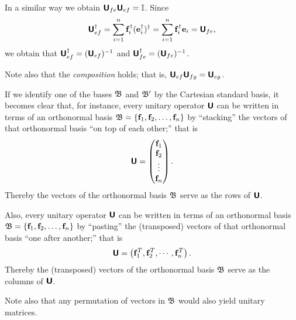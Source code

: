 In a similar way we obtain
$\textsf{\textbf{U}}_{fe}\textsf{\textbf{U}}_{ef}=
{\Bbb I}$.
Since
\begin{equation}
\textsf{\textbf{U}}_{ef}^\dagger = \sum_{i=1}^n  {\bf f}_i^\dagger ( {\bf e}_i^\dagger)^\dagger
= \sum_{i=1}^n  {\bf f}_i^\dagger {\bf e}_i
= \textsf{\textbf{U}}_{fe},
\end{equation}
we obtain that $\textsf{\textbf{U}}_{ef}^\dagger = (\textsf{\textbf{U}}_{ef})^{-1}$
and $\textsf{\textbf{U}}_{fe}^\dagger = (\textsf{\textbf{U}}_{fe})^{-1}$.

Note also that the {\em composition} holds; that is, $\textsf{\textbf{U}}_{ef} \textsf{\textbf{U}}_{fg}=  \textsf{\textbf{U}}_{eg}$.



If we
identify one of the bases  ${\frak B}$ and ${\frak B}'$ by the Cartesian standard basis,
it becomes clear that, for instance,
every unitary operator  $\textsf{\textbf{U}}$  can be written in terms of an orthonormal basis
${\frak B}=\{{\bf f}_1,  {\bf f}_2, \ldots , {\bf f}_n\}$
by ``stacking'' the vectors of that orthonormal basis ``on top of each other;''
that is
\begin{equation}
\textsf{\textbf{U}}=
\begin{pmatrix}
{\bf f}_1\\
{\bf f}_2\\
\vdots\\
{\bf f}_n
\end{pmatrix}
.
\end{equation}
Thereby the vectors of the orthonormal basis  ${\frak B}$ serve as the
rows of $\textsf{\textbf{U}}$.

Also, every unitary operator  $\textsf{\textbf{U}}$  can be written in terms of an orthonormal basis
${\frak B}=\{{\bf f}_1,  {\bf f}_2, \ldots , {\bf f}_n\}$
by ``pasting'' the (transposed) vectors of that orthonormal basis ``one after another;''
that is
\begin{equation}
\textsf{\textbf{U}}= \left(
{\bf f}_1^T,
{\bf f}_2^T,
\cdots,
{\bf f}_n^T
\right).
\end{equation}
Thereby the (transposed) vectors of the orthonormal basis  ${\frak B}$ serve as the
columns of $\textsf{\textbf{U}}$.

Note also that any permutation of vectors in ${\frak B}$ would also yield unitary matrices.







